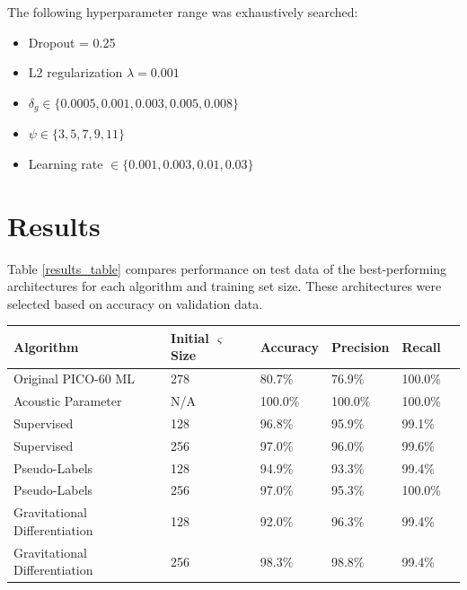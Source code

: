 \documentclass[10pt]{article}
\begin{document}
The following hyperparameter range was exhaustively searched:
\begin{itemize}
    \item Dropout = 0.25
    \item L2 regularization $\lambda = 0.001$
    \item $\delta_g \in \{0.0005, 0.001, 0.003, 0.005, 0.008\}$
    \item $\psi \in \{3, 5, 7, 9, 11\}$
    \item Learning rate $\in \{0.001, 0.003, 0.01, 0.03\}$
\end{itemize}

\section{Results} \label{results}

Table \ref{results_table} compares performance on test data of the best-performing architectures for each algorithm and training set size. These architectures were selected based on accuracy on validation data.

\begin{minipage}{\textwidth}
    \begin{center}
        \begin{tabular}{|l|l|l|l|l|l|}
            \hline
            Algorithm & Initial $\varsigma$ Size & Accuracy & Precision & Recall \\
            \hline
            Original PICO-60 ML & 278 & 80.7\% & 76.9\% & 100.0\% \\
            \hline
            Acoustic Parameter & N/A & 100.0\% & 100.0\% & 100.0\% \\
            \hline
            Supervised & 128 & 96.8\% & 95.9\% & 99.1\% \\
            \hline
            Supervised & 256 & 97.0\% & 96.0\% & 99.6\% \\
            \hline
            Pseudo-Labels & 128 & 94.9\% & 93.3\% & 99.4\% \\
            \hline
            Pseudo-Labels & 256 & 97.0\% & 95.3\% & 100.0\% \\
            \hline
            Gravitational Differentiation & 128 & 92.0\% & 96.3\% & 99.4\% \\
            \hline
            Gravitational Differentiation & 256 & 98.3\% & 98.8\% & 99.4\% \\
            \hline
        \end{tabular}
         \label{results_table}
    \end{center}
\end{minipage}
\end{document}
